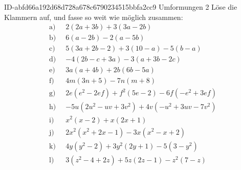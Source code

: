\begin{exercise}
      {ID-abfd66a192d68d728a678c6790234515bbfa2cc9}
      {Umformungen 2}
  \ifproblem\problem
    \newcommand{\gap}{\;\;}%
    Löse die Klammern auf, und fasse so weit wie möglich zusammen:
    \allowdisplaybreaks
    \begin{equation*}
      \begin{split}
        \text{a)}\gap & 2(2a+3b)+3(3a-2b) \\
        \text{b)}\gap & 6(a-2b)-2(a-5b) \\
        \text{c)}\gap & 5(3a+2b-2)+3(10-a)-5(b-a) \\
        \text{d)}\gap & -4(2b-c+3a)-3(a+3b-2c) \\
        \text{e)}\gap & 3a(a+4b)+2b(6b-5a) \\
        \text{f)}\gap & 4m(3n+5)-7n(m+8) \\
        \text{g)}\gap & 2e(e^2-2ef)+f^2(5e-2)-6f(-e^2+3ef) \\
        \text{h)}\gap & -5u(2u^2-uv+3v^2)+4v(-u^2+3uv-7v^2) \\
        \text{i)}\gap & x^2(x-2)+x(2x+1) \\
        \text{j)}\gap & 2x^2(x^2+2x-1)-3x(x^2-x+2) \\
        \text{k)}\gap & 4y(y^2-2)+3y^2(2y+1)-5(3-y^2) \\
        \text{l)}\gap & 3(z^2-4+2z)+5z(2z-1)-z^2(7-z)
      \end{split}
    \end{equation*}
  \fi
  \ifoutcome\outcome
    \newcommand{\toprow}[2][20em]
    {%
      \makebox[#1][l]
      {%
        \ensuremath
        {%
          \displaystyle
          \phantom{\,=\:\,}%
          #2%
        }%
      }%
    }%
    \newcommand{\solutionA}[1]
    {%
      \begin{equation*}
        \begin{split}
          \text{a)} &\toprow[#1]{2(2a+3b)+3(3a-2b)} \\
                    &=           4a+6b+9a-6b        \\
                    &=           4a+9a+6b-6b        \\
                    &=           13a
        \end{split}
      \end{equation*}
    }%
    \newcommand{\solutionB}[1]
    {%
      \begin{equation*}

\end{equation*}}
\end{exercise}

